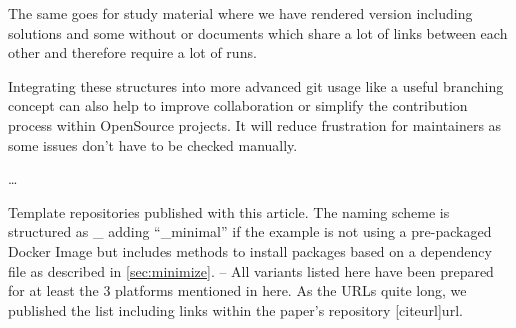 \documentclass[final]{ltugboat}
\begin{document}
The same goes for study material where we have rendered version including solutions and some without or documents which share a lot of links between each other and therefore require a lot of runs.

Integrating these structures into more advanced git usage like a useful branching concept can also help to improve collaboration or simplify the contribution process within OpenSource projects.
It will reduce frustration for maintainers as some issues don't have to be checked manually.

…







\begin{table}
\caption{Template repositories published with this article. The naming scheme is structured as
\_ adding \enquote{\_minimal} if the example is not using a pre-packaged Docker Image but includes methods to install packages based on a dependency file as described in \ref{sec:minimize}. –
All variants listed here have been prepared for at least the 3 platforms mentioned in here.
As the URLs quite long, we published the list including links within the paper's repository {[citeurl]{url}}.
}
\label{tab:demo-repos}


\end{table}
\end{document}
